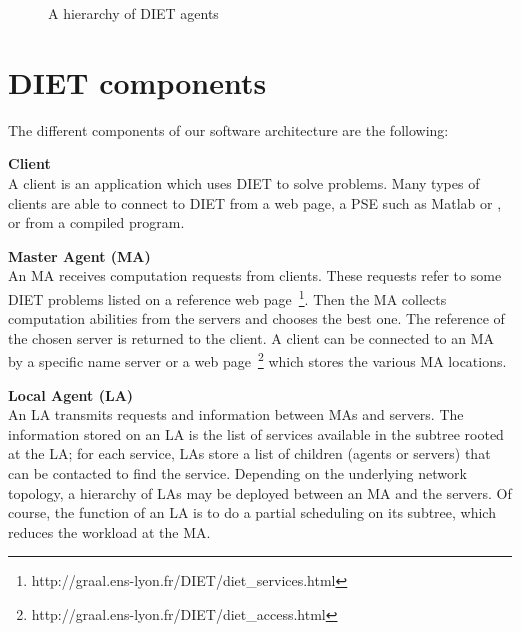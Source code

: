 \begin{figure}[htb]
 \begin{center}
  \caption{\label{fig:platform}A hierarchy of DIET agents}
 \end{center}
\end{figure}

\section{DIET components}
\label{sec:components}

The different components of our software architecture are the following:

\begin{description}
\item \textbf{Client}\\
  A client is an application which uses DIET to solve problems.  Many
  types of clients are able to connect to DIET from a web page, a PSE
  such as Matlab or \sci, or from a compiled program.
\item \textbf{Master Agent (MA)}\\
  An MA receives computation requests from clients. These requests
  refer to some DIET problems listed on a reference web
  page~\footnote{http://graal.ens-lyon.fr/DIET/diet\_services.html}.
  Then the MA collects computation abilities from the servers and
  chooses the best one. The reference of the chosen server is returned
  to the client. A client can be connected to an MA by a specific name
  server or a web
  page~\footnote{http://graal.ens-lyon.fr/DIET/diet\_access.html}
  which stores the various MA locations.

\item \textbf{Local Agent (LA)}\\
  An LA transmits requests and information between MAs and servers.
  The information stored on an LA is the list of services available
  in the subtree rooted at the LA; for each service, LAs store a
  list of children (agents or servers) that can be contacted to find
  the service. Depending on the underlying
  network topology, a hierarchy of LAs may be deployed between an MA
  and the servers. Of course, the function of an LA is to do a partial
  scheduling on its subtree, which reduces the workload at the MA.


\end{description}
